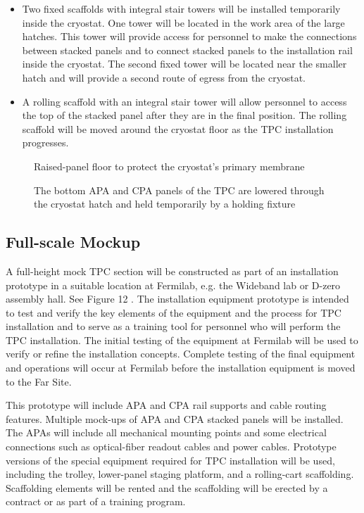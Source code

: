 \begin{itemize}
\item Two fixed scaffolds with integral stair towers will be installed temporarily inside the cryostat. One tower will be located in the work area of the large hatches. This tower will provide access for personnel to make the connections between stacked panels and to connect stacked panels to the installation rail inside the cryostat. The second fixed tower will be located near the smaller hatch and will provide a second route of egress from the cryostat. 
\item A rolling scaffold with an integral stair tower will allow personnel to access the top of the stacked panel after they are in the final position. The rolling scaffold will be moved around the cryostat floor as the TPC installation progresses. 
\end{itemize}

\begin{figure}[htbp]
\centering
\caption{Raised-panel floor to protect the cryostat's primary membrane } 
\label{fig:raised-floor-protect}
\end{figure}

\begin{figure}[htbp]
\centering
\caption{The bottom APA and CPA panels of the TPC are lowered through the cryostat hatch and held temporarily by a holding fixture } 
\label{fig:panels-lowered-hatch}
\end{figure}

\subsection{Full-scale Mockup}
\label{fd:install:tempeqp:fsmockup}

A full-height mock TPC section will be constructed as part of an installation prototype in a suitable location at Fermilab, e.g. the Wideband lab or D-zero assembly hall. See Figure 12 . The installation 
equipment prototype is intended to test and verify the key elements of the equipment and the process for TPC installation and to serve as a training tool for personnel who will perform the TPC installation. The initial testing of the equipment at Fermilab will be used to verify or refine the installation concepts. 
Complete testing of the final equipment and operations will occur at Fermilab before the installation equipment is moved to the Far Site. 

This prototype will include APA and CPA rail supports and cable routing features. Multiple mock-ups of APA and CPA stacked panels will be installed. The APAs will include all mechanical mounting points and 
some electrical connections such as optical-fiber readout cables and power cables. Prototype versions of the special equipment required for TPC installation will be used, including the trolley, lower-panel 
staging platform, and a rolling-cart scaffolding. Scaffolding elements will be rented and the scaffolding will be erected by a contract or as part of a training program. 

